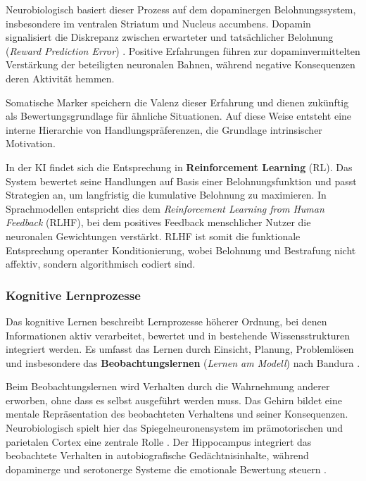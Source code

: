 Neurobiologisch basiert dieser Prozess auf dem dopaminergen Belohnungssystem, insbesondere im ventralen Striatum und Nucleus accumbens. Dopamin signalisiert die Diskrepanz zwischen erwarteter und tatsächlicher Belohnung (\emph{Reward Prediction Error}) \cite{Schultz1997, Berridge1998}. Positive Erfahrungen führen zur dopaminvermittelten Verstärkung der beteiligten neuronalen Bahnen, während negative Konsequenzen deren Aktivität hemmen.  

Somatische Marker speichern die Valenz dieser Erfahrung und dienen zukünftig als Bewertungsgrundlage für ähnliche Situationen. Auf diese Weise entsteht eine interne Hierarchie von Handlungspräferenzen, die Grundlage intrinsischer Motivation.  

In der KI findet sich die Entsprechung in \textbf{Reinforcement Learning} (RL). Das System bewertet seine Handlungen auf Basis einer Belohnungsfunktion und passt Strategien an, um langfristig die kumulative Belohnung zu maximieren. In Sprachmodellen entspricht dies dem \emph{Reinforcement Learning from Human Feedback} (RLHF), bei dem positives Feedback menschlicher Nutzer die neuronalen Gewichtungen verstärkt. RLHF ist somit die funktionale Entsprechung operanter Konditionierung, wobei Belohnung und Bestrafung nicht affektiv, sondern algorithmisch codiert sind.


\subsubsection*{Kognitive Lernprozesse}

Das kognitive Lernen beschreibt Lernprozesse höherer Ordnung, bei denen Informationen aktiv verarbeitet, bewertet und in bestehende Wissensstrukturen integriert werden. Es umfasst das Lernen durch Einsicht, Planung, Problemlösen und insbesondere das \textbf{Beobachtungslernen} (\emph{Lernen am Modell}) nach Bandura \cite{Bandura1977}.

Beim Beobachtungslernen wird Verhalten durch die Wahrnehmung anderer erworben, ohne dass es selbst ausgeführt werden muss. Das Gehirn bildet eine mentale Repräsentation des beobachteten Verhaltens und seiner Konsequenzen. Neurobiologisch spielt hier das Spiegelneuronensystem im prämotorischen und parietalen Cortex eine zentrale Rolle \cite{Rizzolatti2004}. Der Hippocampus integriert das beobachtete Verhalten in autobiografische Gedächtnisinhalte, während dopaminerge und serotonerge Systeme die emotionale Bewertung steuern \cite{Iacoboni2009}.

